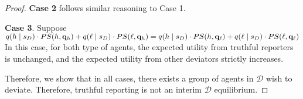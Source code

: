 \begin{proof}
    \noindent\textbf{Case 2} follows similar reasoning to Case 1.

    \noindent\textbf{Case 3}. Suppose $q(h\mid s_D)\cdot PS(h, \mathbf{q}_h) + q(\ell \mid s_D)\cdot PS(\ell, \mathbf{q}_h) = q(h\mid s_D)\cdot PS(h, \mathbf{q}_\ell) + q(\ell \mid s_D)\cdot PS(\ell, \mathbf{q}_\ell)$ In this case, for both type of agents, the expected utility from truthful reporters is unchanged, and the expected utility from other deviators strictly increases. 

    Therefore, we show that in all cases, there exists a group of agents in $\mathcal{D}$ wish to deviate. Therefore, truthful reporting is not an interim $\mathcal{D}$ equilibrium.  
\end{proof}
